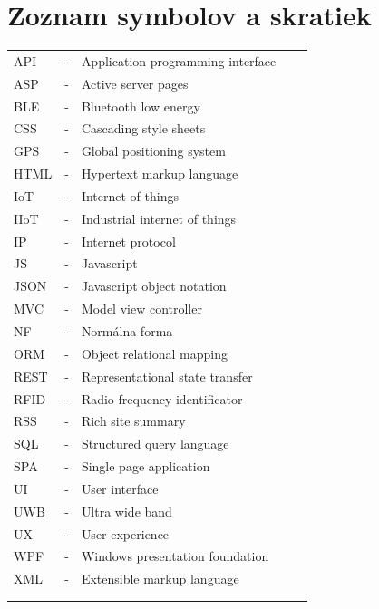 \documentclass[11pt, oneside]{report}
\begin{document}


\newpage 
\tableofcontents



\newpage

\chapter*{ Zoznam symbolov a skratiek }
\begin{table}[H]
\label{my-label}
\begin{tabular}{lllll}
API  & - &  Application programming interface &  &  \\
ASP&- & Active server pages  &  &  \\
BLE & - &  Bluetooth low energy &  &  \\
CSS & - &  Cascading style sheets &  &  \\
GPS  & - &  Global positioning system &  &  \\
HTML & - &  Hypertext markup language&  &  \\
IoT   & - & Internet of things  &  &  \\
IIoT   & - & Industrial internet of things  &  &  \\
IP  & - &  Internet protocol &  &  \\
JS   & - & Javascript  &  &  \\
JSON & - & Javascript object notation &  &  \\
MVC  & - &  Model view controller &  &  \\
NF & - &  Normálna forma &  &  \\
ORM & - &  Object relational mapping &  &  \\
REST & - & Representational state transfer&  &  \\
RFID & - &  Radio frequency identificator &  &  \\
RSS & - &  Rich site summary &  &  \\
SQL  & - &  Structured query language&  &  \\
SPA  & - &  Single page application&  &  \\
UI  & - &  User interface &  &  \\
UWB  & - &  Ultra wide band &  &  \\
UX  & - &  User experience &  &  \\
WPF & - &  Windows presentation foundation &  &  \\
XML  & - &  Extensible markup language &  &  \\
 &  &  &  &  \\
 &  &  &  & 
\end{tabular}
\end{table}
\newpage 
\end{document}
